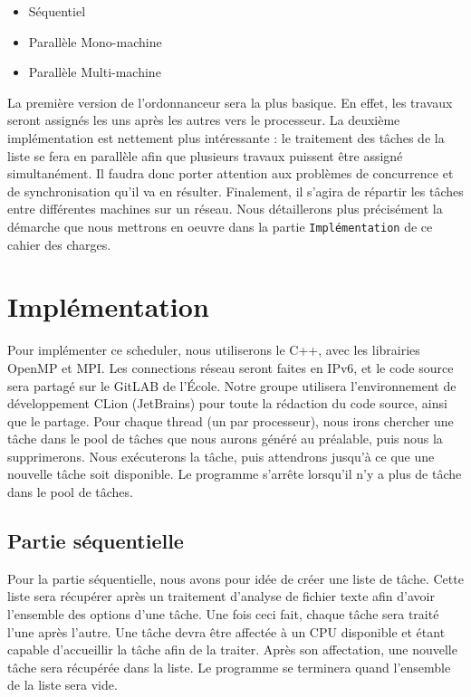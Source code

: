 \documentclass[a4paper,11pt,final]{report}
\begin{document}
    \begin{itemize}
        \item Séquentiel
        \item Parallèle Mono-machine
        \item Parallèle Multi-machine
    \end{itemize}
    
    La première version de l'ordonnanceur sera la plus basique. En effet, les travaux seront assignés les uns après les autres vers le processeur.\newline
    La deuxième implémentation est nettement plus intéressante : le traitement des tâches de la liste se fera en parallèle afin que plusieurs travaux puissent être assigné simultanément. Il faudra donc porter attention aux problèmes de concurrence et de synchronisation qu'il va en résulter. \newline 
    Finalement, il s'agira de répartir les tâches entre différentes machines sur un réseau. Nous détaillerons plus précisément la démarche que nous mettrons en oeuvre dans la partie \texttt{Implémentation} de ce cahier des charges.


\chapter{Implémentation}

    Pour implémenter ce scheduler, nous utiliserons le C++, avec les librairies OpenMP et MPI. Les connections réseau seront faites en IPv6, et le code source sera partagé sur le GitLAB de l'École. Notre groupe utilisera l'environnement de développement CLion (JetBrains) pour toute la rédaction du code source, ainsi que le partage. Pour chaque thread (un par processeur), nous irons chercher une tâche dans le pool de tâches que nous aurons généré au préalable, puis nous la supprimerons. Nous exécuterons la tâche, puis attendrons jusqu'à ce que une nouvelle tâche soit disponible. Le programme s'arrête lorsqu'il n'y a plus de tâche dans le pool de tâches.

\section{Partie séquentielle}

    Pour la partie séquentielle, nous avons pour idée de créer une liste de tâche. Cette liste sera récupérer après un traitement d'analyse de fichier texte afin d'avoir l'ensemble des options d'une tâche. Une fois ceci fait, chaque tâche sera traité l'une après l'autre. Une tâche devra être affectée à un CPU disponible et étant capable d'accueillir la tâche afin de la traiter. Après son affectation, une nouvelle tâche sera récupérée dans la liste. Le programme se terminera quand l'ensemble de la liste sera vide.
\end{document}
